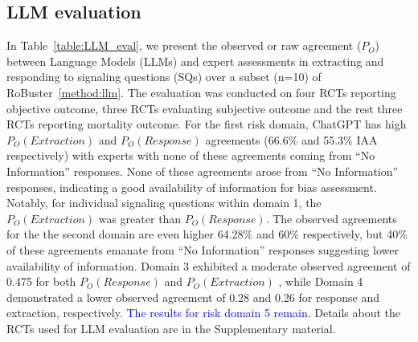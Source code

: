 \documentclass[sn-mathphys,Numbered]{sn-jnl}%
\theoremstyle{thmstyleone}%
\theoremstyle{thmstyletwo}%
\theoremstyle{thmstylethree}%
\begin{document}
%
%
%
\subsection{LLM evaluation}
%
In Table~\ref{table:LLM_eval}, we present the observed or raw agreement ($P_{O}$) between Language Models (LLMs) and expert assessments in extracting and responding to signaling questions (SQs) over a subset (n=10) of RoBuster~\ref{method:llm}. 
The evaluation was conducted on four RCTs reporting objective outcome, three RCTs evaluating subjective outcome and the rest three RCTs reporting mortality outcome.
For the first risk domain, ChatGPT has high $P_{O} (Extraction)$ and $P_{O} (Response)$ agreements (66.6\% and 55.3\% IAA respectively) with experts with none of these agreements coming from ``No Information'' responses.
None of these agreements arose from ``No Information'' responses, indicating a good availability of information for bias assessment. 
Notably, for individual signaling questions within domain 1, the $P_{O} (Extraction)$ was greater than $P_{O} (Response)$.
The observed agreements for the the second domain are even higher 64.28\% and 60\% respectively, but 40\% of these agreements emanate from ``No Information'' responses suggesting lower availability of information. 
Domain 3 exhibited a moderate observed agreement of 0.475 for both $P_{O} (Response)$ and $P_{O} (Extraction)$ , while Domain 4 demonstrated a lower observed agreement of 0.28 and 0.26 for response and extraction, respectively.
\textcolor{blue}{The results for risk domain 5 remain.}
Details about the RCTs used for LLM evaluation are in the Supplementary material.
\end{document}
